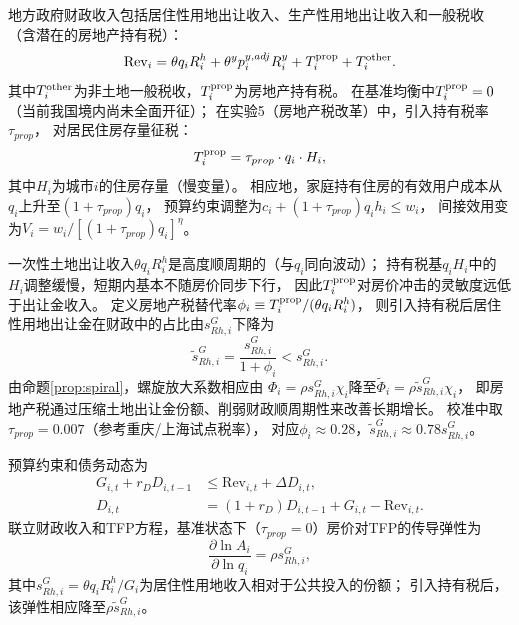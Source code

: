 \documentclass[UTF8,a4paper,12pt]{ctexart}
\theoremstyle{plain}
\theoremstyle{definition}
\theoremstyle{remark}
\newcommand{\Ry}{R^{y}}
\newcommand{\Rh}{R^{h}}
\begin{document}
地方政府财政收入包括居住性用地出让收入、生产性用地出让收入和一般税收
（含潜在的房地产持有税）：
\begin{equation}
  \text{Rev}_i=\theta q_i\Rh_i+\theta^y p_i^{y,adj}\Ry_i+T_i^{\rm prop}+T_i^{\rm other}.
  \label{eq:revenue}
\end{equation}
其中$T_i^{\rm other}$为非土地一般税收，$T_i^{\rm prop}$为房地产持有税。
在基准均衡中$T_i^{\rm prop}=0$（当前我国境内尚未全面开征）；
在实验5（房地产税改革）中，引入持有税率$\tau_{prop}$，
对居民住房存量征税：
\begin{equation}
  T_i^{\rm prop}=\tau_{prop}\cdot q_i\cdot H_i,
  \label{eq:prop_tax}
\end{equation}
其中$H_i$为城市$i$的住房存量（慢变量）。
相应地，家庭持有住房的有效用户成本从$q_i$上升至$(1+\tau_{prop})q_i$，
预算约束调整为$c_i+(1+\tau_{prop})q_i h_i\leq w_i$，
间接效用变为$V_i=w_i/[(1+\tau_{prop})q_i]^\eta$。

一次性土地出让收入$\theta q_i\Rh_i$是高度顺周期的（与$q_i$同向波动）；
持有税基$q_i H_i$中的$H_i$调整缓慢，短期内基本不随房价同步下行，
因此$T_i^{\rm prop}$对房价冲击的灵敏度远低于出让金收入。
定义房地产税替代率$\phi_i\equiv T_i^{\rm prop}/(\theta q_i\Rh_i)$，
则引入持有税后居住性用地出让金在财政中的占比由$s_{Rh,i}^G$下降为
\begin{equation}
  \tilde{s}_{Rh,i}^G = \frac{s_{Rh,i}^G}{1+\phi_i} < s_{Rh,i}^G.
  \label{eq:prop_tax_share}
\end{equation}
由命题\ref{prop:spiral}，螺旋放大系数相应由
$\Phi_i=\rho s_{Rh,i}^G\chi_i$降至$\tilde{\Phi}_i=\rho\tilde{s}_{Rh,i}^G\chi_i$，
即房地产税通过压缩土地出让金份额、削弱财政顺周期性来改善长期增长。
校准中取$\tau_{prop}=0.007$（参考重庆/上海试点税率），
对应$\phi_i\approx 0.28$，$\tilde{s}_{Rh,i}^G\approx 0.78 s_{Rh,i}^G$。

预算约束和债务动态为
\begin{align}
  G_{i,t}+r_DD_{i,t-1}&\leq \text{Rev}_{i,t}+\Delta D_{i,t},
  \label{eq:gov_budget}\\
  D_{i,t}&=(1+r_D)D_{i,t-1}+G_{i,t}-\text{Rev}_{i,t}.
  \label{eq:debt}
\end{align}
联立财政收入和TFP方程，基准状态下（$\tau_{prop}=0$）房价对TFP的传导弹性为
\begin{equation}
  \frac{\partial\ln A_i}{\partial\ln q_i}=\rho s_{Rh,i}^G,
  \label{eq:tfp_q_elas}
\end{equation}
其中$s_{Rh,i}^G=\theta q_i\Rh_i/G_i$为居住性用地收入相对于公共投入的份额；
引入持有税后，该弹性相应降至$\rho\tilde{s}_{Rh,i}^G$。
\end{document}
